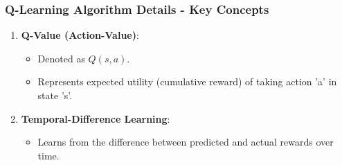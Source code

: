 \documentclass[aspectratio=169]{beamer}
\begin{document}
\begin{frame}[fragile]
    \frametitle{Q-Learning Algorithm Details - Key Concepts}
    \begin{enumerate}
        \item \textbf{Q-Value (Action-Value)}:
            \begin{itemize}
                \item Denoted as $Q(s, a)$.
                \item Represents expected utility (cumulative reward) of taking action 'a' in state 's'.
            \end{itemize}
        \item \textbf{Temporal-Difference Learning}:
            \begin{itemize}
                \item Learns from the difference between predicted and actual rewards over time.
            \end{itemize}
    \end{enumerate}
\end{frame}
\end{document}
